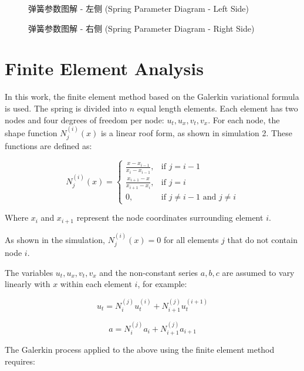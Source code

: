 \documentclass{mcmthesis}  %
\begin{document}
\begin{appendices}
\begin{figure}[h!]
    \centering
    \caption{弹簧参数图解 - 左侧 (Spring Parameter Diagram - Left Side)}
    \label{fig:spring_params_left}
\end{figure}

\begin{figure}[h!]
    \centering
    \caption{弹簧参数图解 - 右侧 (Spring Parameter Diagram - Right Side)}
    \label{fig:spring_params_right}
\end{figure}

\section{Finite Element Analysis}  %

In this work, the finite element method based on the Galerkin variational formula is used. The spring is divided into $n$ equal length elements. Each element has two nodes and four degrees of freedom per node: $u_t, u_x, v_t, v_x$. For each node, the shape function $N_j^{(i)}(x)$ is a linear roof form, as shown in simulation 2. These functions are defined as:

\begin{equation}
N_j^{(i)}(x) = 
\begin{cases}
\frac{x-x_{i-1}}{x_i-x_{i-1}}, & \text{if } j = i-1 \\
\frac{x_{i+1}-x}{x_{i+1}-x_i}, & \text{if } j = i \\
0, & \text{if } j \neq i-1 \text{ and } j \neq i
\end{cases}
\end{equation}

Where $x_i$ and $x_{i+1}$ represent the node coordinates surrounding element $i$.

As shown in the simulation, $N_j^{(i)}(x) = 0$ for all elements $j$ that do not contain node $i$.

The variables $u_t, u_x, v_t, v_x$ and the non-constant series $a, b, c$ are assumed to vary linearly with $x$ within each element $i$, for example:

\begin{equation}
u_t = N_i^{(j)}u_t^{(i)} + N_{i+1}^{(j)}u_t^{(i+1)}
\end{equation}

\begin{equation}
a = N_i^{(j)}a_i + N_{i+1}^{(j)}a_{i+1}
\end{equation}

The Galerkin process applied to the above using the finite element method requires:


\end{appendices}
\end{document}
